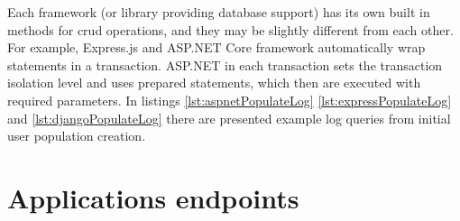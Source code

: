 Each framework (or library providing database support) has its own built in methods for \acrshort{crud} operations, and they may be slightly different from each other. For example, Express.js and ASP.NET Core framework automatically wrap statements in a transaction. ASP.NET in each transaction sets the transaction isolation level and uses prepared statements, which then are executed with required parameters. In listings \ref{lst:aspnetPopulateLog} \ref{lst:expressPopulateLog} and \ref{lst:djangoPopulateLog} there are presented example log queries from initial user population creation.





\section{Applications endpoints}\label{sec:endpoints}

